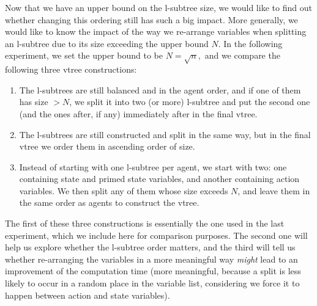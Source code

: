 \documentclass[11pt]{article}
\begin{document}
Now that we have an upper bound on the l-subtree size, we would like to find out whether changing this ordering still has such a big impact. More generally, we would like to know the impact of the way we re-arrange variables when splitting an l-subtree due to its size exceeding the upper bound $N$. In the following experiment, we set the upper bound to be $N = \sqrt{n},$ and we compare the following three vtree constructions: 
\begin{enumerate}
\item The l-subtrees are still balanced and in the agent order, and if one of them has size $> N$, we split it into two (or more) l-subtree and put the second one (and the ones after, if any) immediately after in the final vtree.
\item The l-subtrees are still constructed and split in the same way, but in the final vtree we order them in ascending order of size. 
\item Instead of starting with one l-subtree per agent, we start with two: one containing state and primed state variables, and another containing action variables. We then split any of them whose size exceeds $N$, and leave them in the same order as agents to construct the vtree. 
\end{enumerate}
The first of these three constructions is essentially the one used in the last experiment, which we include here for comparison purposes. The second one will help us explore whether the l-subtree order matters, and the third will tell us whether re-arranging the variables in a more meaningful way \textit{might} lead to an improvement of the computation time (more meaningful, because a split is less likely to occur in a random place in the variable list, considering we force it to happen between action and state variables).
\end{document}
